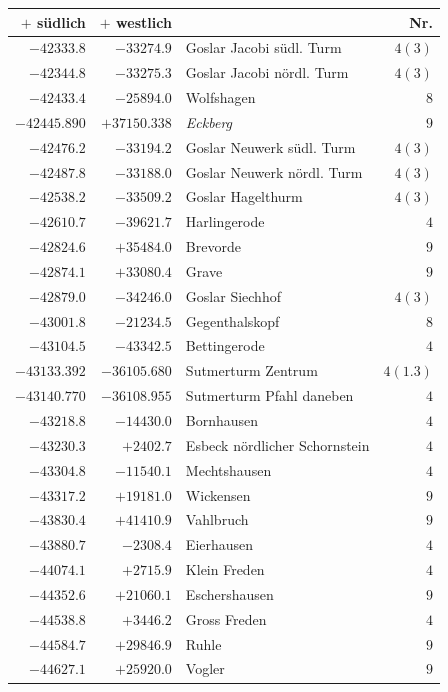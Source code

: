 \clearpage
\begin{center}\begingroup\fontsize{8}{9}\selectfont
\setlength{\tabcolsep}{4pt}
\begin{tabular}{r|r|p{170pt}|r}\hline
\(+\) südlich&\(+\) westlich&&Nr.\\\hline
\(-42333.8\)&\(-33274.9\)&Goslar Jacobi südl. Turm&\(4 (3)\)\\
\(-42344.8\)&\(-33275.3\)&Goslar Jacobi nördl. Turm&\(4 (3)\)\\
\(-42433.4\)&\(-25894.0\)&Wolfshagen&\(8\)\\
\(-42445.890\)&\(+37150.338\)&\textit{Eckberg}&\(9\)\\
\(-42476.2\)&\(-33194.2\)&Goslar Neuwerk südl. Turm&\(4 (3)\)\\
\(-42487.8\)&\(-33188.0\)&Goslar Neuwerk nördl. Turm&\(4 (3)\)\\
\(-42538.2\)&\(-33509.2\)&Goslar Hagelthurm&\(4 (3)\)\\
\(-42610.7\)&\(-39621.7\)&Harlingerode&\(4\)\\
\(-42824.6\)&\(+35484.0\)&Brevorde&\(9\)\\
\(-42874.1\)&\(+33080.4\)&Grave&\(9\)\\
\(-42879.0\)&\(-34246.0\)&Goslar Siechhof&\(4 (3)\)\\
\(-43001.8\)&\(-21234.5\)&Gegenthalskopf&\(8\)\\
\(-43104.5\)&\(-43342.5\)&Bettingerode&\(4\)\\
\(-43133.392\)&\(-36105.680\)&Sutmerturm Zentrum&\(4(1.3)\)\\
\(-43140.770\)&\(-36108.955\)&Sutmerturm Pfahl daneben&\(4\)\\
\(-43218.8\)&\(-14430.0\)&Bornhausen&\(4\)\\
\(-43230.3\)&\(+2402.7\)&Esbeck nördlicher Schornstein&\(4\)\\
\(-43304.8\)&\(-11540.1\)&Mechtshausen&\(4\)\\
\(-43317.2\)&\(+19181.0\)&Wickensen&\(9\)\\
\(-43830.4\)&\(+41410.9\)&Vahlbruch&\(9\)\\
\(-43880.7\)&\(-2308.4\)&Eierhausen&\(4\)\\
\(-44074.1\)&\(+2715.9\)&Klein Freden&\(4\)\\
\(-44352.6\)&\(+21060.1\)&Eschershausen&\(9\)\\
\(-44538.8\)&\(+3446.2\)&Gross Freden&\(4\)\\
\(-44584.7\)&\(+29846.9\)&Ruhle&\(9\)\\
\(-44627.1\)&\(+25920.0\)&Vogler&\(9\)\\

\end{tabular}
\end{center}
